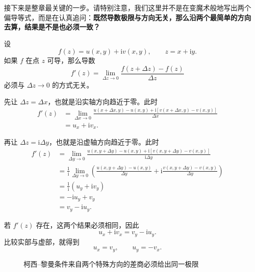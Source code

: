 接下来是整章最关键的一步。请特别注意，我们这里并不是在变魔术般地写出两个偏导等式，而是在认真追问：\textbf{既然导数极限与方向无关，那么沿两个最简单的方向去算，结果是不是也必须一致？}

设
\[
    f(z)=u(x,y)+\mathrm{i}v(x,y),\qquad z=x+\mathrm{i}y.
\]
如果 $f$ 在点 $z$ 可导，那么导数
\[
    f'(z)=\lim_{\Delta z\to 0}\frac{f(z+\Delta z)-f(z)}{\Delta z}
\]
必须与 $\Delta z\to 0$ 的方式无关。

先让 $\Delta z=\Delta x$，也就是沿实轴方向趋近于零。此时
\begin{align*}
    f'(z)
    &=\lim_{\Delta x\to 0}
    \frac{u(x+\Delta x,y)-u(x,y)+\mathrm{i}[v(x+\Delta x,y)-v(x,y)]}{\Delta x}\\
    &=u_x+\mathrm{i}v_x.
\end{align*}

再让 $\Delta z=\mathrm{i}\Delta y$，也就是沿虚轴方向趋近于零。此时
\begin{align*}
    f'(z)
    &=\lim_{\Delta y\to 0}
    \frac{u(x,y+\Delta y)-u(x,y)+\mathrm{i}[v(x,y+\Delta y)-v(x,y)]}{\mathrm{i}\Delta y}\\
    &=\frac{1}{\mathrm{i}}
    \lim_{\Delta y\to 0}
    \left(
        \frac{u(x,y+\Delta y)-u(x,y)}{\Delta y}
        +\mathrm{i}\frac{v(x,y+\Delta y)-v(x,y)}{\Delta y}
    \right)\\
    &=\frac{1}{\mathrm{i}}\left(u_y+\mathrm{i}v_y\right)\\
    &=-\mathrm{i}u_y+v_y\\
    &=v_y-\mathrm{i}u_y.
\end{align*}

若 $f'(z)$ 存在，这两个结果必须相同，因此
\[
    u_x+\mathrm{i}v_x=v_y-\mathrm{i}u_y.
\]
比较实部与虚部，就得到
\begin{equation}\label{eq:ch02-cr}
    u_x=v_y,\qquad u_y=-v_x.
\end{equation}

\begin{figure}[htbp]
\centering
{}
\caption{柯西--黎曼条件来自两个特殊方向的差商必须给出同一极限}
\label{fig:ch02-cr-derivation}
\end{figure}

